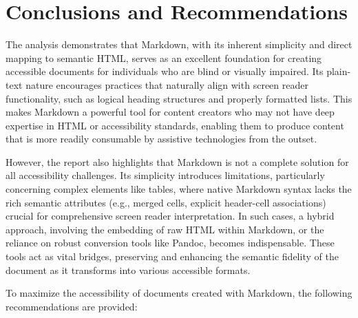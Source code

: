 \section{Conclusions and Recommendations}
\label{sec:conclusions-markdown}

The analysis demonstrates that Markdown, with its inherent simplicity and direct mapping to semantic HTML, serves as an excellent foundation for creating accessible documents for individuals who are blind or visually impaired. Its plain-text nature encourages practices that naturally align with screen reader functionality, such as logical heading structures and properly formatted lists. This makes Markdown a powerful tool for content creators who may not have deep expertise in HTML or accessibility standards, enabling them to produce content that is more readily consumable by assistive technologies from the outset.

However, the report also highlights that Markdown is not a complete solution for all accessibility challenges. Its simplicity introduces limitations, particularly concerning complex elements like tables, where native Markdown syntax lacks the rich semantic attributes (e.g., merged cells, explicit header-cell associations) crucial for comprehensive screen reader interpretation. In such cases, a hybrid approach, involving the embedding of raw HTML within Markdown, or the reliance on robust conversion tools like Pandoc, becomes indispensable. These tools act as vital bridges, preserving and enhancing the semantic fidelity of the document as it transforms into various accessible formats.

To maximize the accessibility of documents created with Markdown, the following recommendations are provided:

